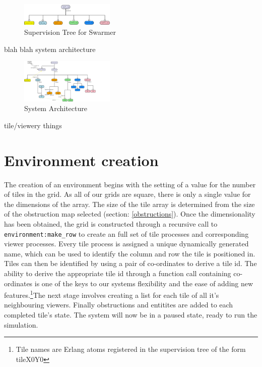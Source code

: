 \documentclass[10pt, a4paper, conference, compsocconf]{IEEEtran}
\begin{document}
\begin{figure}[h]
  \centering
  \includegraphics[width=0.4\textwidth]{../img/supervisor.png}
\caption{Supervision Tree for Swarmer}
    \label{fig:sup_tree}
\end{figure}

blah blah system architecture

\begin{figure}[h]
  \centering
  \includegraphics[width=0.4\textwidth]{../img/final_system_ws.png}
\caption{System Architecture}
    \label{fig:system_ws}
\end{figure}

tile/viewery things


\section{Environment creation \label{environment_creation}}
The creation of an environment begins with the setting of a value for the number of tiles in the grid. As all of our grids are square, there is only a single value for the dimensions of the array. The size of the tile array is determined from the size of the obstruction map selected (section: \ref{obstructions}). Once the dimensionality has been obtained, the grid is constructed through a recursive call to \verb+environment:make_row+ to create an full set of tile processes and corresponding viewer processes. Every tile process is assigned a unique dynamically generated name, which can be used to identify the column and row the tile is positioned in. Tiles can then be identified by using a pair of co-ordinates to derive a tile id. The ability to derive the appropriate tile id through a function call containing co-ordinates is one of the keys to our systems flexibility and the ease of adding new features.\footnote{Tile names are Erlang atoms registered in the supervision tree of the form tileX0Y0}The next stage involves creating a list for each tile of all it's neighbouring viewers. Finally obstructions and entitites are added to each completed tile's state. The system will now be in a paused state, ready to run the simulation.
\end{document}
